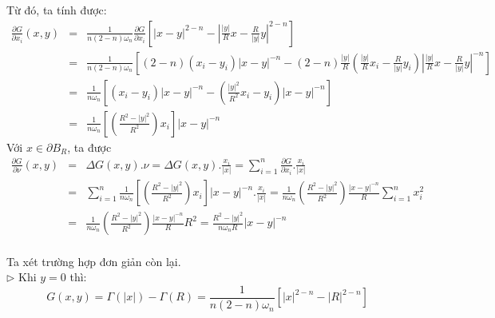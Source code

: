 Từ đó, ta tính được:
\begin{eqnarray}
\frac{{\partial G}}
{{\partial x_i }}\left( {x,y} \right)& =& \frac{1}
{{n\left( {2 - n} \right)\omega _n }}\frac{{\partial G}}
{{\partial x_i }}\left[ {\left| {x - y} \right|^{2 - n}  - \left| {\frac{{\left| y \right|}}
{R}x - \frac{R}
{{\left| y \right|}}y} \right|^{2 - n} } \right]\nonumber\\
& = &\frac{1}
{{n\left( {2 - n} \right)\omega _n }}\left[ {\left( {2 - n} \right)\left( {x_i  - y_i } \right)\left| {x - y} \right|^{ - n}  - \left( {2 - n} \right)\frac{{\left| y \right|}}
{R}\left( {\frac{{\left| y \right|}}
{R}x_i  - \frac{R}
{{\left| y \right|}}y_i } \right)\left| {\frac{{\left| y \right|}}
{R}x - \frac{R}
{{\left| y \right|}}y} \right|^{ - n} } \right]\nonumber\\
& = &\frac{1}
{{n\omega _n }}\left[ {\left( {x_i  - y_i } \right)\left| {x - y} \right|^{ - n}  - \left( {\frac{{\left| y \right|^2 }}
{{R^2 }}x_i  - y_i } \right)\left| {x - y} \right|^{ - n} } \right]\nonumber\\
& = &\frac{1}
{{n\omega _n }}\left[ {\left( {\frac{{R^2  - \left| y \right|^2 }}
{{R^2 }}} \right)x_i } \right]\left| {x - y} \right|^{ - n} \nonumber
\end{eqnarray}
Với $
x \in \partial B_R 
$, ta được
\begin{eqnarray}
\frac{{\partial G}}
{{\partial \nu }}\left( {x,y} \right)& = &\Delta G\left( {x,y} \right).\nu  = \Delta G\left( {x,y} \right).\frac{{x_i }}
{{\left| x \right|}} = \sum\limits_{i = 1}^n {\frac{{\partial G}}
{{\partial x_i }}.} \frac{{x_i }}
{{\left| x \right|}}\nonumber\\
 &= &\sum\limits_{i = 1}^n {\frac{1}
{{n\omega _n }}\left[ {\left( {\frac{{R^2  - \left| y \right|^2 }}
{{R^2 }}} \right)x_i } \right]\left| {x - y} \right|^{ - n} .} \frac{{x_i }}
{{\left| x \right|}} = \frac{1}
{{n\omega _n }}\left( {\frac{{R^2  - \left| y \right|^2 }}
{{R^2 }}} \right)\frac{{\left| {x - y} \right|^{ - n} }}
{R}\sum\limits_{i = 1}^n {x_i^2 } \nonumber\\
& = &\frac{1}
{{n\omega _n }}\left( {\frac{{R^2  - \left| y \right|^2 }}
{{R^2 }}} \right)\frac{{\left| {x - y} \right|^{ - n} }}
{R}R^2  = \frac{{R^2  - \left| y \right|^2 }}
{{n\omega _n R}}\left| {x - y} \right|^{ - n} \nonumber
\end{eqnarray}
\\Ta xét trường hợp đơn giản còn lại.\\
$\triangleright$ Khi $
y = 0
$ thì:
\[
G\left( {x,y} \right) = \Gamma \left( {\left| x \right|} \right) - \Gamma \left( R \right) = \frac{1}
{{n\left( {2 - n} \right)\omega _n }}\left[ {\left| x \right|^{2 - n}  - \left| R \right|^{2 - n} } \right]
\]
